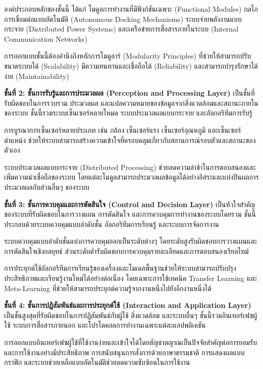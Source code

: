 \documentclass[a4paper]{article}
\begin{document}
องค์ประกอบหลักของชั้นนี้ ได้แก่ โมดูลการทำงานที่มีฟังก์ชันเฉพาะ (Functional Modules) กลไกการเชื่อมต่อแบบอัตโนมัติ (Autonomous Docking Mechanisms) ระบบจ่ายพลังงานแบบกระจาย (Distributed Power Systems) และเครือข่ายการสื่อสารภายในระบบ (Internal Communication Networks)

การออกแบบชั้นนี้ต้องคำนึงถึงหลักการโมดูลาร์ (Modularity Principles) ที่ช่วยให้สามารถปรับขนาดระบบได้ (Scalability) มีความทนทานและเชื่อถือได้ (Reliability) และสามารถบำรุงรักษาได้ง่าย (Maintainability)

\textbf{ชั้นที่ 2: ชั้นการรับรู้และการประมวลผล (Perception and Processing Layer)} เป็นชั้นที่รับผิดชอบในการรวบรวม ประมวลผล และแปลความหมายของข้อมูลจากสิ่งแวดล้อมและสถานะภายในของระบบ ชั้นนี้รวมระบบเซ็นเซอร์หลายโหมด ระบบประมวลผลแบบกระจาย และอัลกอริทึมการรับรู้

การบูรณาการเซ็นเซอร์หลายประเภท เช่น กล้อง เซ็นเซอร์แรง เซ็นเซอร์อุณหภูมิ และเซ็นเซอร์ตำแหน่ง ช่วยให้ระบบสามารถสร้างความเข้าใจที่ครอบคลุมเกี่ยวกับสถานการณ์รอบตัวและสถานะของตัวเอง

ระบบประมวลผลแบบกระจาย (Distributed Processing) ช่วยลดความล่าช้าในการตอบสนองและเพิ่มความน่าเชื่อถือของระบบ โดยแต่ละโมดูลสามารถประมวลผลข้อมูลได้อย่างอิสระและแบ่งปันผลการประมวลผลกับส่วนอื่นๆ ของระบบ

\textbf{ชั้นที่ 3: ชั้นการควบคุมและการตัดสินใจ (Control and Decision Layer)} เป็นหัวใจสำคัญของระบบที่รับผิดชอบในการวางแผน การตัดสินใจ และการควบคุมการทำงานของระบบโดยรวม ชั้นนี้ประกอบด้วยระบบควบคุมแบบลำดับชั้น อัลกอริทึมการเรียนรู้ และระบบการจัดการงาน

ระบบควบคุมแบบลำดับชั้นแบ่งการควบคุมออกเป็นระดับต่างๆ โดยระดับสูงรับผิดชอบการวางแผนและการตัดสินใจเชิงกลยุทธ์ ส่วนระดับต่ำรับผิดชอบการควบคุมรายละเอียดและการตอบสนองเรียลไทม์

การประยุกต์ใช้อัลกอริทึมการเรียนรู้ของเครื่องและโมเดลพื้นฐานช่วยให้ระบบสามารถปรับปรุงประสิทธิภาพและเรียนรู้งานใหม่ได้อย่างต่อเนื่อง โดยเฉพาะการใช้เทคนิค Transfer Learning และ Meta-Learning ที่ช่วยให้สามารถประยุกต์ความรู้จากงานหนึ่งไปยังอีกงานหนึ่งได้

\textbf{ชั้นที่ 4: ชั้นการปฏิสัมพันธ์และการประยุกต์ใช้ (Interaction and Application Layer)} เป็นชั้นสูงสุดที่รับผิดชอบในการปฏิสัมพันธ์กับผู้ใช้ สิ่งแวดล้อม และระบบอื่นๆ ชั้นนี้รวมอินเทอร์เฟซผู้ใช้ ระบบการสื่อสารภายนอก และโปรโตคอลการทำงานเฉพาะแต่ละแอปพลิเคชัน

การออกแบบอินเทอร์เฟซผู้ใช้ที่ใช้งานง่ายและเข้าใจได้โดยสัญชาตญาณเป็นปัจจัยสำคัญต่อการยอมรับและการใช้งานอย่างมีประสิทธิภาพ การสนับสนุนการสั่งการด้วยภาษาธรรมชาติ การแสดงผลแบบกราฟิก และระบบช่วยเหลือแบบอัตโนมัติช่วยลดความซับซ้อนในการใช้งาน
\end{document}
